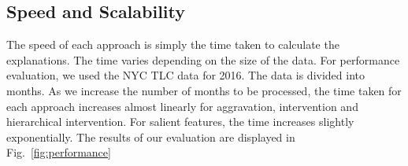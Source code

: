 











\subsection{Speed and Scalability}
\label{sec:speed}
The speed of each approach is simply the time taken to calculate the explanations. The time varies depending on the size of the data. For performance evaluation, we used the NYC TLC data for 2016. The data is divided into months. As we increase the number of months to be processed, the time taken for each approach increases almost linearly for aggravation, intervention and hierarchical intervention. For salient features, the time increases slightly exponentially. The results of our evaluation are displayed in Fig.~\ref{fig:performance}

